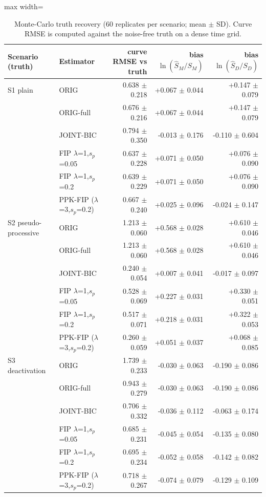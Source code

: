 \begin{table}[t]
\centering
\caption{Monte-Carlo truth recovery (60 replicates per scenario; mean $\pm$ SD). Curve RMSE is computed against the noise-free truth on a dense time grid.}\label{tab:sim}
\footnotesize
\begin{adjustbox}{max width=\linewidth}
\begin{tabular}{llrrr}
\toprule
Scenario (truth) & Estimator & curve RMSE vs truth & bias $\ln(\hat S_M/S_M)$ & bias $\ln(\hat S_D/S_D)$ \\
\midrule
S1 plain & ORIG & 0.638 $\pm$ 0.218 & +0.067 $\pm$ 0.044 & +0.147 $\pm$ 0.079 \\
 & ORIG-full & 0.676 $\pm$ 0.216 & +0.067 $\pm$ 0.044 & +0.147 $\pm$ 0.079 \\
 & JOINT-BIC & 0.794 $\pm$ 0.350 & -0.013 $\pm$ 0.176 & -0.110 $\pm$ 0.604 \\
 & FIP $\lambda$=1,$s_p$=0.05 & 0.637 $\pm$ 0.228 & +0.071 $\pm$ 0.050 & +0.076 $\pm$ 0.090 \\
 & FIP $\lambda$=1,$s_p$=0.2 & 0.639 $\pm$ 0.229 & +0.071 $\pm$ 0.050 & +0.076 $\pm$ 0.090 \\
 & PPK-FIP ($\lambda$=3,$s_p$=0.2) & 0.667 $\pm$ 0.240 & +0.025 $\pm$ 0.096 & -0.024 $\pm$ 0.147 \\
\midrule
S2 pseudo-processive & ORIG & 1.213 $\pm$ 0.060 & +0.568 $\pm$ 0.028 & +0.610 $\pm$ 0.046 \\
 & ORIG-full & 1.213 $\pm$ 0.060 & +0.568 $\pm$ 0.028 & +0.610 $\pm$ 0.046 \\
 & JOINT-BIC & 0.240 $\pm$ 0.054 & +0.007 $\pm$ 0.041 & -0.017 $\pm$ 0.097 \\
 & FIP $\lambda$=1,$s_p$=0.05 & 0.528 $\pm$ 0.069 & +0.227 $\pm$ 0.031 & +0.330 $\pm$ 0.051 \\
 & FIP $\lambda$=1,$s_p$=0.2 & 0.517 $\pm$ 0.071 & +0.218 $\pm$ 0.031 & +0.322 $\pm$ 0.053 \\
 & PPK-FIP ($\lambda$=3,$s_p$=0.2) & 0.260 $\pm$ 0.059 & +0.051 $\pm$ 0.037 & +0.068 $\pm$ 0.085 \\
\midrule
S3 deactivation & ORIG & 1.739 $\pm$ 0.233 & -0.030 $\pm$ 0.063 & -0.190 $\pm$ 0.086 \\
 & ORIG-full & 0.943 $\pm$ 0.279 & -0.030 $\pm$ 0.063 & -0.190 $\pm$ 0.086 \\
 & JOINT-BIC & 0.706 $\pm$ 0.332 & -0.036 $\pm$ 0.112 & -0.063 $\pm$ 0.174 \\
 & FIP $\lambda$=1,$s_p$=0.05 & 0.685 $\pm$ 0.231 & -0.045 $\pm$ 0.054 & -0.135 $\pm$ 0.080 \\
 & FIP $\lambda$=1,$s_p$=0.2 & 0.695 $\pm$ 0.234 & -0.052 $\pm$ 0.058 & -0.142 $\pm$ 0.082 \\
 & PPK-FIP ($\lambda$=3,$s_p$=0.2) & 0.718 $\pm$ 0.267 & -0.074 $\pm$ 0.079 & -0.129 $\pm$ 0.109 \\
\bottomrule
\end{tabular}
\end{adjustbox}
\end{table}

